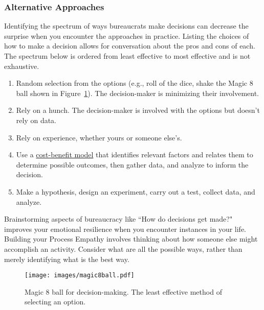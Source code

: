 \subsubsection*{Alternative Approaches}
Identifying the spectrum of ways bureaucrats make decisions can decrease the surprise when you encounter the approaches in practice. 
Listing the choices of how to make a decision allows for conversation about the pros and cons of each. The spectrum below is ordered from least effective to most effective and is not exhaustive.
\begin{enumerate}
    \item Random selection from the options (e.g., roll of the dice, shake the Magic 8 ball shown in Figure~\ref{fig:magic8ball}). The decision-maker is minimizing their involvement. 
    \item Rely on a hunch. The decision-maker is involved with the options but doesn't rely on data. 
    \item Rely on experience, whether yours or someone else's.
    \item Use a \href{https://en.wikipedia.org/wiki/Cost\%E2\%80\%93benefit_analysis}{cost-benefit model} that identifies relevant factors and relates them to determine possible outcomes, 
    \iftoggle{WPinmargin}{\marginpar{$>$Wikipedia: cost-benefit analysis}}{} then gather data, and analyze to inform the decision.
    \item Make a hypothesis, design an experiment, carry out a test, collect data, and analyze.
\end{enumerate}

Brainstorming aspects of bureaucracy like ``How do decisions get made?" improves your emotional resilience when you encounter instances in your life. Building your Process Empathy involves thinking about how someone else might accomplish an activity. Consider what are all the possible ways, rather than merely identifying what is the best way.

\begin{figure}
    \centering
    \texttt{[image: images/magic8ball.pdf]}
    \caption{Magic 8 ball for decision-making. The least effective method of selecting an option.}
    \label{fig:magic8ball}
\end{figure}

